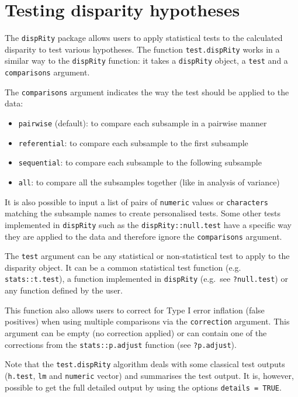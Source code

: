 \documentclass[]{book}
\providecommand{\tightlist}{%
  \setlength{\itemsep}{0pt}\setlength{\parskip}{0pt}}
\theoremstyle{definition}
\theoremstyle{definition}
\theoremstyle{remark}
\begin{document}
\section{Testing disparity
hypotheses}\label{testing-disparity-hypotheses}

The \texttt{dispRity} package allows users to apply statistical tests to
the calculated disparity to test various hypotheses. The function
\texttt{test.dispRity} works in a similar way to the \texttt{dispRity}
function: it takes a \texttt{dispRity} object, a \texttt{test} and a
\texttt{comparisons} argument.

The \texttt{comparisons} argument indicates the way the test should be
applied to the data:

\begin{itemize}
\tightlist
\item
  \texttt{pairwise} (default): to compare each subsample in a pairwise
  manner
\item
  \texttt{referential}: to compare each subsample to the first subsample
\item
  \texttt{sequential}: to compare each subsample to the following
  subsample
\item
  \texttt{all}: to compare all the subsamples together (like in analysis
  of variance)
\end{itemize}

It is also possible to input a list of pairs of \texttt{numeric} values
or \texttt{characters} matching the subsample names to create
personalised tests. Some other tests implemented in \texttt{dispRity}
such as the \texttt{dispRity::null.test} have a specific way they are
applied to the data and therefore ignore the \texttt{comparisons}
argument.

The \texttt{test} argument can be any statistical or non-statistical
test to apply to the disparity object. It can be a common statistical
test function (e.g. \texttt{stats::t.test}), a function implemented in
\texttt{dispRity} (e.g.~see \texttt{?null.test}) or any function defined
by the user.

This function also allows users to correct for Type I error inflation
(false positives) when using multiple comparisons via the
\texttt{correction} argument. This argument can be empty (no correction
applied) or can contain one of the corrections from the
\texttt{stats::p.adjust} function (see \texttt{?p.adjust}).

Note that the \texttt{test.dispRity} algorithm deals with some classical
test outputs (\texttt{h.test}, \texttt{lm} and \texttt{numeric} vector)
and summarises the test output. It is, however, possible to get the full
detailed output by using the options \texttt{details\ =\ TRUE}.
\end{document}
